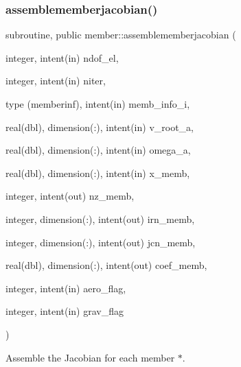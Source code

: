 \subsubsection{\texorpdfstring{assemblememberjacobian()}{assemblememberjacobian()}}
{\footnotesize\ttfamily subroutine, public member\+::assemblememberjacobian (\begin{DoxyParamCaption}\item[{integer, intent(in)}]{ndof\+\_\+el,  }\item[{integer, intent(in)}]{niter,  }\item[{type (memberinf), intent(in)}]{memb\+\_\+info\+\_\+i,  }\item[{real(dbl), dimension(\+:), intent(in)}]{v\+\_\+root\+\_\+a,  }\item[{real(dbl), dimension(\+:), intent(in)}]{omega\+\_\+a,  }\item[{real(dbl), dimension(\+:), intent(in)}]{x\+\_\+memb,  }\item[{integer, intent(out)}]{nz\+\_\+memb,  }\item[{integer, dimension(\+:), intent(out)}]{irn\+\_\+memb,  }\item[{integer, dimension(\+:), intent(out)}]{jcn\+\_\+memb,  }\item[{real(dbl), dimension(\+:), intent(out)}]{coef\+\_\+memb,  }\item[{integer, intent(in)}]{aero\+\_\+flag,  }\item[{integer, intent(in)}]{grav\+\_\+flag }\end{DoxyParamCaption})}



Assemble the Jacobian for each member $\ast$. 


